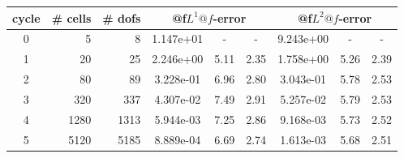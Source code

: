 \documentclass[10pt]{report}
\begin{document}
\begin{table}[H]
\begin{center}
\begin{tabular}{|c|r|r|c|c|c|c|c|c|} \hline
cycle & \# cells & \# dofs & 
\multicolumn{3}{|c|}{@f$L^1@f$-error} & 
\multicolumn{3}{|c|}{@f$L^2@f$-error}\\ \hline
0 & 5 & 8 & 1.147e+01 & - & - & 9.243e+00 & - & -\\ \hline
1 & 20 & 25 & 2.246e+00 & 5.11 & 2.35 & 1.758e+00 & 5.26 & 2.39\\ \hline
2 & 80 & 89 & 3.228e-01 & 6.96 & 2.80 & 3.043e-01 & 5.78 & 2.53\\ \hline
3 & 320 & 337 & 4.307e-02 & 7.49 & 2.91 & 5.257e-02 & 5.79 & 2.53\\ \hline
4 & 1280 & 1313 & 5.944e-03 & 7.25 & 2.86 & 9.168e-03 & 5.73 & 2.52\\ \hline
5 & 5120 & 5185 & 8.889e-04 & 6.69 & 2.74 & 1.613e-03 & 5.68 & 2.51\\ \hline
\end{tabular}
\end{center}
\end{table}
\end{document}
